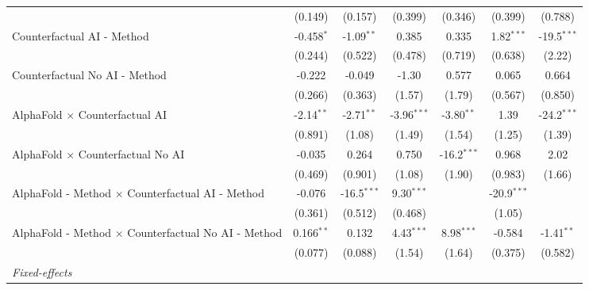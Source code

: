 \begin{tabular}{lcccccc}
                                                              & (0.149)       & (0.157)       & (0.399)       & (0.346)       & (0.399)       & (0.788)\\   
   Counterfactual AI - Method                                 & -0.458$^{*}$  & -1.09$^{**}$  & 0.385         & 0.335         & 1.82$^{***}$  & -19.5$^{***}$\\   
                                                              & (0.244)       & (0.522)       & (0.478)       & (0.719)       & (0.638)       & (2.22)\\   
   Counterfactual No AI - Method                              & -0.222        & -0.049        & -1.30         & 0.577         & 0.065         & 0.664\\   
                                                              & (0.266)       & (0.363)       & (1.57)        & (1.79)        & (0.567)       & (0.850)\\   
   AlphaFold $\times$ Counterfactual AI                       & -2.14$^{**}$  & -2.71$^{**}$  & -3.96$^{***}$ & -3.80$^{**}$  & 1.39          & -24.2$^{***}$\\   
                                                              & (0.891)       & (1.08)        & (1.49)        & (1.54)        & (1.25)        & (1.39)\\   
   AlphaFold $\times$ Counterfactual No AI                    & -0.035        & 0.264         & 0.750         & -16.2$^{***}$ & 0.968         & 2.02\\   
                                                              & (0.469)       & (0.901)       & (1.08)        & (1.90)        & (0.983)       & (1.66)\\   
   AlphaFold - Method $\times$ Counterfactual AI - Method     & -0.076        & -16.5$^{***}$ & 9.30$^{***}$  &               & -20.9$^{***}$ &   \\   
                                                              & (0.361)       & (0.512)       & (0.468)       &               & (1.05)        &   \\   
   AlphaFold - Method $\times$ Counterfactual No AI - Method  & 0.166$^{**}$  & 0.132         & 4.43$^{***}$  & 8.98$^{***}$  & -0.584        & -1.41$^{**}$\\   
                                                              & (0.077)       & (0.088)       & (1.54)        & (1.64)        & (0.375)       & (0.582)\\   
   \midrule
   \emph{Fixed-effects}\\

\end{tabular}
